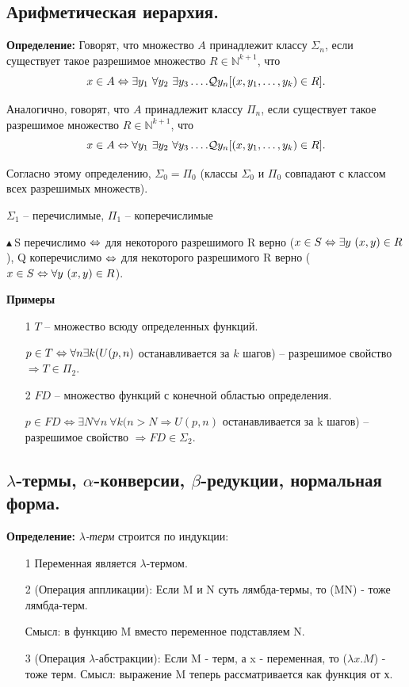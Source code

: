 \subsection{Арифметическая иерархия.}

\textbf{Определение: } Говорят, что множество $A $ принадлежит классу $\Sigma_n$, если существует такое разрешимое множество $R \in \mathbb{N}^{k+1}$, что
$$x \in A \Leftrightarrow \exists y_1 \ \forall y_2 \ \exists y_3 \ldots. \mathcal{Q} y_n [(x, y_1,\ldots,y_k) \in R].$$ 

Аналогично, говорят, что $A$ принадлежит классу $\Pi_n$, если существует такое разрешимое множество $R \in \mathbb{N}^{k+1}$, что
$$x \in A \Leftrightarrow \forall y_1 \ \exists y_2 \ \forall y_3 \ldots. \mathcal{Q} y_n [(x, y_1,\ldots,y_k) \in R].$$

Согласно этому определению, $\Sigma_0 = \Pi_0$ (классы $\Sigma_0$ и $\Pi_0$ совпадают с классом всех разрешимых множеств).

$\Sigma_1$ -- перечислимые, $\Pi_1$ -- коперечислимые

$\blacktriangle \ $S перечислимо $\Leftrightarrow$ для некоторого разрешимого R верно ($x \in S \lra \exists y \ (x,y) \in R$), Q коперечислимо $\Leftrightarrow$ для некоторого разрешимого R верно ($x \in S \Leftrightarrow \forall y \ (x,y) \in R$).

\textbf{Примеры}
\begin{itemize}
    \item[1] $T$ -- множество всюду определенных функций.
    
    $p \in T \Leftrightarrow \forall n \exists k (U(p,n)$ останавливается за $k$ шагов) -- разрешимое свойство $\Rightarrow T \in \Pi_2$.
    
    \item[2] $FD$ -- множество функций с конечной областью определения.
    
    $p \in FD \Leftrightarrow \exists N \forall n \ \forall k  (n > N \Rightarrow U(p,n)$ останавливается за k шагов) -- разрешимое свойство $\Rightarrow FD \in \Sigma_2$.
\end{itemize}

\subsection{$\lambda$-термы, $\alpha$-конверсии, $\beta$-редукции, нормальная форма.}

\textbf{Определение: } \textit{$\lambda$-терм} строится по индукции:
\begin{itemize}
    \item[1] Переменная является $\lambda$-термом.
    \item[2](Операция аппликации): Если M и N суть лямбда-термы, то (MN) - тоже лямбда-терм.
    
    Смысл: в функцию M вместо переменное подставляем N.
    \item[3](Операция $\lambda$-абстракции): Если M - терм, а x - переменная, то ($\lambda x.M$) - тоже терм.
    Смысл: выражение M теперь рассматривается как функция от х.
\end{itemize}

